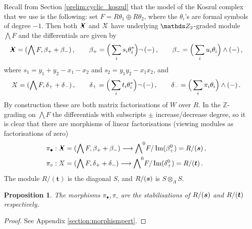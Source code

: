 \documentclass{compositio}
\newtheorem{proposition}[theorem]{Proposition}
\theoremstyle{definition}
\numberwithin{equation}{section}
\def\Im{\operatorname{Im}}
\begin{document}
Recall from Section \ref{prelim:cyclic_koszul} that the model of the Koszul complex that we use is the following: set $F = R \theta_1 \oplus R \theta_2$, where the $\theta_{i}$'s are formal symbols of degree $-1$. Then both $\Xbul$ and $\Xcirc$ have underlying $\Ztwo$-graded module $\bigwedge F$ and the differentials are given by
\[
\Xbul = ( \bigwedge F, \beta_+ + \beta_{-}) \, , \qquad \beta_+ = \Big(\sum_i s_i \theta_i^*\Big) \neg\, (-) \, , \qquad \beta_{-} = \Big(\sum_i u_i \theta_i\Big) \wedge (-) \, ,
\]
where $s_1 = y_1 + y_2 - x_1 - x_2$ and $s_2 = y_1 y_2 - x_1 x_2$, and
\[
\Xcirc = ( \bigwedge F, \delta_+ + \delta_{-}) \, , \qquad \delta_+ = \Big(\sum_i t_i \theta_i^*\Big) \neg\, (-) \, , \qquad \delta_{-} = \Big(\sum_i \pi_i \theta_i\Big) \wedge (-) \, .
\]
By construction these are both matrix factorisations of $W$ over $R$. In the $\mathds{Z}$-grading on $\bigwedge F$ the differentials with subscripts $\pm$ increase/decrease degree, so it is clear that there are morphisms of linear factorisations (viewing modules as factorisations of zero)
\begin{align*}
& \pi_{\bullet}: \Xbul = ( \bigwedge F, \beta_+ + \beta_{-}) \lto {\bigwedge}^0 F/\Im(\beta_+^0) = R/(\boldsymbol{s}) \, ,\\
& \pi_{\circ}: \Xcirc = ( \bigwedge F, \delta_+ + \delta_{-}) \lto {\bigwedge}^0 F/\Im(\delta_+^0) = R/(\boldsymbol{t}) \, .
\end{align*}
The module $R/(\boldsymbol{t})$ is the diagonal $S$, and $R/(\boldsymbol{s})$ is $S \otimes_A S$. 

\begin{proposition} The morphisms $\pi_{\bullet}, \pi_{\circ}$ are the stabilisations of $R/(\boldsymbol{s})$ and $R/(\boldsymbol{t})$ respectively.
\end{proposition}
\begin{proof}
See Appendix \ref{section:morphismpert}.
\end{proof}
\end{document}
